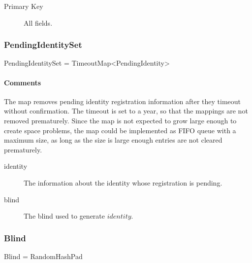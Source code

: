 \documentclass[a4paper,10pt]{article}
\begin{document}
\SpecialItem
\begin{description}
 \item[Primary Key] All fields.
\end{description}

\subsubsection{PendingIdentitySet}

\begin{verbbox}
PendingIdentitySet = TimeoutMap<PendingIdentity>
\end{verbbox}
\begin{center}
\theverbbox
\end{center}

\begin{inparaitem}[ ]
 \item \unique
 \item \secure
 \item \persistent
\end{inparaitem}

\paragraph*{Comments}
The map removes pending identity registration information after they timeout without confirmation. The timeout is set to a year, so that the mappings are not removed prematurely. 
Since the map is not expected to grow large enough to create space problems, the map could be implemented as FIFO queue with a maximum size, as long as the size is large enough 
entries are not cleared prematurely.

\SpecialItem
\begin{description}
 \item[identity] The information about the identity whose registration is pending.
 \item[blind] The blind used to generate $identity$.
\end{description}

\subsubsection{Blind}

\begin{verbbox}
Blind = RandomHashPad
\end{verbbox}
\begin{center}
\theverbbox
\end{center}
\end{document}

